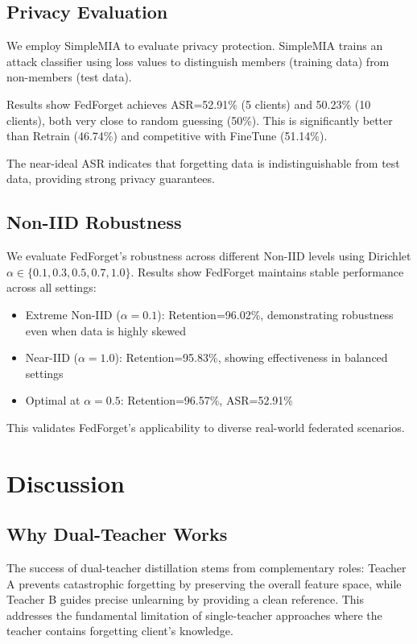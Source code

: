 \documentclass[11pt,a4paper]{article}
\begin{document}
\subsection{Privacy Evaluation}

We employ SimpleMIA to evaluate privacy protection. SimpleMIA trains an attack classifier using loss values to distinguish members (training data) from non-members (test data).

Results show FedForget achieves ASR=52.91\% (5 clients) and 50.23\% (10 clients), both very close to random guessing (50\%). This is significantly better than Retrain (46.74\%) and competitive with FineTune (51.14\%).

The near-ideal ASR indicates that forgetting data is indistinguishable from test data, providing strong privacy guarantees.

\subsection{Non-IID Robustness}

We evaluate FedForget's robustness across different Non-IID levels using Dirichlet $\alpha \in \{0.1, 0.3, 0.5, 0.7, 1.0\}$. Results show FedForget maintains stable performance across all settings:

\begin{itemize}
\item Extreme Non-IID ($\alpha=0.1$): Retention=96.02\%, demonstrating robustness even when data is highly skewed
\item Near-IID ($\alpha=1.0$): Retention=95.83\%, showing effectiveness in balanced settings
\item Optimal at $\alpha=0.5$: Retention=96.57\%, ASR=52.91\%
\end{itemize}

This validates FedForget's applicability to diverse real-world federated scenarios.

\section{Discussion}

\subsection{Why Dual-Teacher Works}

The success of dual-teacher distillation stems from complementary roles: Teacher A prevents catastrophic forgetting by preserving the overall feature space, while Teacher B guides precise unlearning by providing a clean reference. This addresses the fundamental limitation of single-teacher approaches where the teacher contains forgetting client's knowledge.
\end{document}
